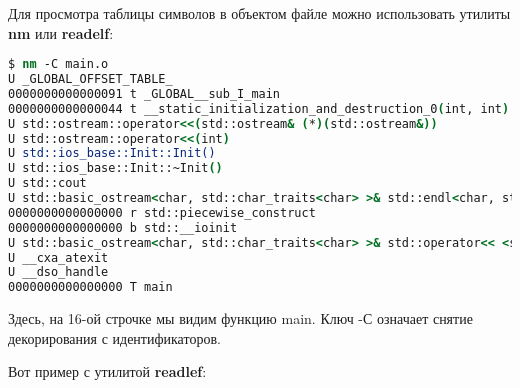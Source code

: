 Для просмотра таблицы символов в объектом файле можно использовать утилиты \textbf{nm} или \textbf{readelf}:

\begin{lstlisting}[language=csh, numbers=none]
$ nm -C main.o
U _GLOBAL_OFFSET_TABLE_
0000000000000091 t _GLOBAL__sub_I_main
0000000000000044 t __static_initialization_and_destruction_0(int, int)
U std::ostream::operator<<(std::ostream& (*)(std::ostream&))
U std::ostream::operator<<(int)
U std::ios_base::Init::Init()
U std::ios_base::Init::~Init()
U std::cout
U std::basic_ostream<char, std::char_traits<char> >& std::endl<char, std::char_traits<char> >(std::basic_ostream<char, std::char_traits<char> >&)
0000000000000000 r std::piecewise_construct
0000000000000000 b std::__ioinit
U std::basic_ostream<char, std::char_traits<char> >& std::operator<< <std::char_traits<char> >(std::basic_ostream<char, std::char_traits<char> >&, char const*)
U __cxa_atexit
U __dso_handle
0000000000000000 T main
\end{lstlisting}

Здесь, на 16-ой строчке мы видим функцию main. Ключ -С означает снятие декорирования с идентификаторов.

Вот пример с утилитой \textbf{readlef}:

